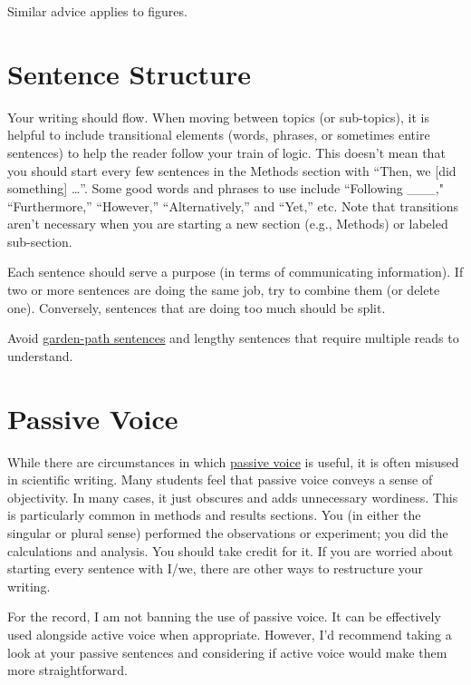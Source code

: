 \documentclass[]{book}
\begin{document}
Similar advice applies to figures.

\section{Sentence Structure}\label{sentence-structure}

Your writing should flow. When moving between topics (or sub-topics), it
is helpful to include transitional elements (words, phrases, or
sometimes entire sentences) to help the reader follow your train of
logic. This doesn't mean that you should start every few sentences in
the Methods section with ``Then, we {[}did something{]} \ldots{}''. Some
good words and phrases to use include ``Following \_\_\_,"
``Furthermore,'' ``However,'' ``Alternatively,'' and ``Yet,'' etc. Note
that transitions aren't necessary when you are starting a new section
(e.g., Methods) or labeled sub-section.

Each sentence should serve a purpose (in terms of communicating
information). If two or more sentences are doing the same job, try to
combine them (or delete one). Conversely, sentences that are doing too
much should be split.

Avoid
\href{https://en.wikipedia.org/wiki/Garden-path_sentence}{garden-path
sentences} and lengthy sentences that require multiple reads to
understand.

\section{Passive Voice}\label{passive-voice}

While there are circumstances in which
\href{https://www.quickanddirtytips.com/education/grammar/active-voice-versus-passive-voice}{passive
voice} is useful, it is often misused in scientific writing. Many
students feel that passive voice conveys a sense of objectivity. In many
cases, it just obscures and adds unnecessary wordiness. This is
particularly common in methods and results sections. You (in either the
singular or plural sense) performed the observations or experiment; you
did the calculations and analysis. You should take credit for it. If you
are worried about starting every sentence with I/we, there are other
ways to restructure your writing.

For the record, I am not banning the use of passive voice. It can be
effectively used alongside active voice when appropriate. However, I'd
recommend taking a look at your passive sentences and considering if
active voice would make them more straightforward.
\end{document}
